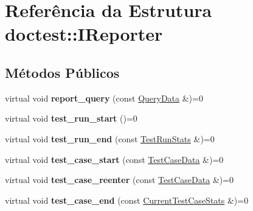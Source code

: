 \hypertarget{structdoctest_1_1IReporter}{}\section{Referência da Estrutura doctest\+:\+:I\+Reporter}
\label{structdoctest_1_1IReporter}
\subsection*{Métodos Públicos}
\begin{DoxyCompactItemize}
\item 
\mbox{\label{structdoctest_1_1IReporter_ae7e30d1c2cd332094c66d39bf3a85e52}} 
virtual void {\bfseries report\+\_\+query} (const \hyperlink{structdoctest_1_1QueryData}{Query\+Data} \&)=0
\item 
\mbox{\label{structdoctest_1_1IReporter_a7f4a4b654726d4b266c91cc0e1569f96}} 
virtual void {\bfseries test\+\_\+run\+\_\+start} ()=0
\item 
\mbox{\label{structdoctest_1_1IReporter_a610495b7caa29e36b5ea62bff62952ed}} 
virtual void {\bfseries test\+\_\+run\+\_\+end} (const \hyperlink{structdoctest_1_1TestRunStats}{Test\+Run\+Stats} \&)=0
\item 
\mbox{\label{structdoctest_1_1IReporter_afa107df2d0230607e2f86f1876f48526}} 
virtual void {\bfseries test\+\_\+case\+\_\+start} (const \hyperlink{structdoctest_1_1TestCaseData}{Test\+Case\+Data} \&)=0
\item 
\mbox{\label{structdoctest_1_1IReporter_a46c2fe41e5fa3d6930a3cb26d81ed764}} 
virtual void {\bfseries test\+\_\+case\+\_\+reenter} (const \hyperlink{structdoctest_1_1TestCaseData}{Test\+Case\+Data} \&)=0
\item 
\mbox{\label{structdoctest_1_1IReporter_a43f8f19681dd5d42218ecb4fd935cda7}} 
virtual void {\bfseries test\+\_\+case\+\_\+end} (const \hyperlink{structdoctest_1_1CurrentTestCaseStats}{Current\+Test\+Case\+Stats} \&)=0
\item 
\mbox{\label{structdoctest_1_1IReporter_a40b0cdf1ad59dabc736e35fde63d516f}} 

\end{DoxyCompactItemize}
